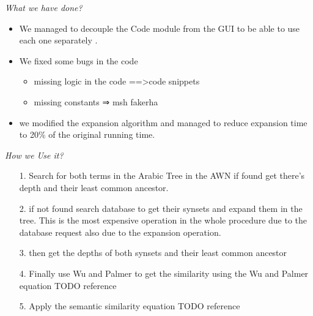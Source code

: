 \textit{What we have done?}
\begin{itemize}
\item We managed to decouple the Code module from the GUI to be able to use each one separately .
\item We fixed some bugs in the code 
\begin{itemize}
\item missing logic in the code ==>code snippets
\item missing constants ⇒ msh fakerha
\end{itemize}
\item we modified the expansion algorithm and managed to reduce expansion time to 20\% of the original running time.
\end{itemize}

\textit{How we Use it?}

\begin{itemize}
\item [1.] Search for both terms in the Arabic Tree in the AWN if found get there’s  depth and their least common ancestor.
\item [2.] if not found search database to get their synsets and expand them in the tree. This is the most expensive operation in the whole procedure due to the database request also due to the expansion operation.
\item [3.] then get the depths of both synsets and their least common ancestor 
\item [4.] Finally use Wu and Palmer to get the similarity using the Wu and Palmer equation TODO reference
\item [5.] Apply the semantic similarity equation TODO reference
\end{itemize}

